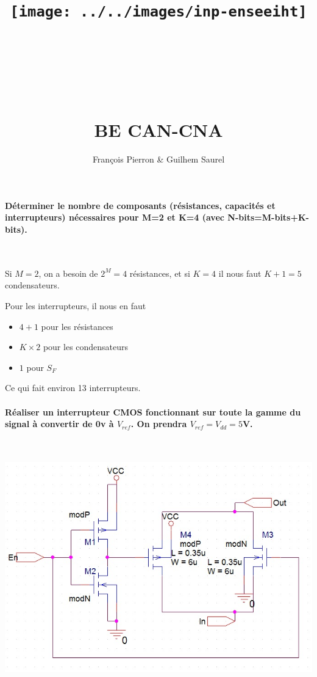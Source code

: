 \documentclass{article}
\title{\texttt{[image: ../../images/inp-enseeiht]} \\ ~ \\ ~ \\ ~ \\ ~ \\ BE CAN-CNA}
\author{François Pierron \& Guilhem Saurel}
\date{\oldstylenums{\today}}
\begin{document}
\begin{titlepage}
    \setcounter{page}{0}
    \maketitle
    \thispagestyle{empty}
\end{titlepage}

\paragraph{Déterminer le nombre de composants (résistances, capacités et interrupteurs) nécessaires pour \textbf{M=2} et \textbf{K=4} (avec N-bits=M-bits+K-bits).}

~

Si $M=2$, on a besoin de $2^M=4$ résistances, et si $K=4$ il nous faut $K+1=5$ condensateurs.

Pour les interrupteurs, il nous en faut

\begin{itemize}
    \item $4+1$ pour les résistances
    \item $K\times 2$ pour les condensateurs
    \item $1$ pour $S_F$
\end{itemize}

Ce qui fait environ 13 interrupteurs.

\paragraph{Réaliser un interrupteur CMOS fonctionnant sur toute la gamme du signal à convertir de 0v à $V_{ref}$. On prendra $V_{ref} = V_{dd} = 5$V.}

~

\includegraphics[width=\linewidth]{becancna/interrupteur.jpg}
\end{document}
